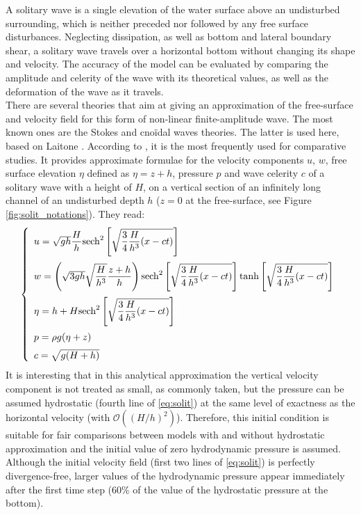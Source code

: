 A solitary wave is a single elevation of the water surface above an undisturbed surrounding,
which is neither preceded nor followed by any free surface disturbances. Neglecting
dissipation, as well as bottom and lateral boundary shear, a solitary wave travels over a
horizontal bottom without changing its shape and velocity.
The accuracy of the model can be evaluated by comparing the
amplitude and celerity of the wave with its theoretical values, as well as the deformation
of the wave as it travels.\\

There are several theories that aim at giving an approximation of the free-surface and velocity
field for this form of non-linear finite-amplitude wave. The most known ones are the Stokes and cnoïdal
waves theories. The latter is used here, based on Laitone \cite{Laitone1960}. According to \cite{Jankowski1999}, it
is the most frequently used for comparative studies.
It provides approximate formulae for the
velocity components $u$, $w$, free surface elevation $\eta$ defined as $\eta = z + h$,
pressure $p$ and wave celerity $c$ of a
solitary wave with a height of $H$, on a vertical section of an infinitely long channel of an undisturbed
depth $h$ ($z = 0$ at the free-surface, see Figure \ref{fig:solit_notations}). They read:
\begin{equation}
\label{eq:solit}
\left\{\begin{array}{l}
u = \sqrt{gh}\dfrac{H}{h}\text{sech}^2\left[\sqrt{\dfrac{3}{4}\dfrac{H}{h^3}(x-ct)}\right] \medskip \\
w = \left(\sqrt{3gh}\sqrt{\dfrac{H}{h^3}}\dfrac{z+h}{h}\right)\text{sech}^2\left[\sqrt{\dfrac{3}{4}\dfrac{H}{h^3}(x-ct)}\right]
\text{tanh}\left[\sqrt{\dfrac{3}{4}\dfrac{H}{h^3}(x-ct)}\right] \medskip \\
\eta = h+H\text{sech}^2\left[\sqrt{\dfrac{3}{4}\dfrac{H}{h^3}(x-ct)}\right] \medskip \\
p= \rho g (\eta + z) \medskip \\
c = \sqrt{g(H+h)}
\end{array}\right.
\end{equation}
It is interesting that in this analytical approximation the vertical velocity component is
not treated as small, as commonly taken, but the pressure can be assumed hydrostatic
(fourth line of \eqref{eq:solit}) at the same level of exactness as the horizontal velocity
(with $\mathcal{O}((H/h)^2)$)\cite{Laitone1960}.
Therefore, this initial condition is suitable for fair comparisons between models
with and without hydrostatic approximation and the initial value of zero hydrodynamic
pressure is assumed. Although the initial velocity field (first two lines of \eqref{eq:solit})
is perfectly divergence-free, larger values of the hydrodynamic pressure appear immediately after the first time
step (60\% of the value of the hydrostatic pressure at the bottom).\\

